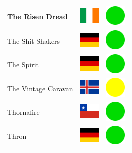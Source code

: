 \documentclass[12pt, a4paper, twoside]{report}
\begin{document}
\begin{center}
\begin{longtable}{|p{5cm}|p{2cm}|p{2cm}|}
 The Risen Dread                                            & \includegraphics[width=1cm]{4x3/ie} &   \includegraphics[width=1cm]{likes/y} \\ \hline
 The Shit Shakers                                           & \includegraphics[width=1cm]{4x3/de} &   \includegraphics[width=1cm]{likes/y} \\ \hline
 The Spirit                                                 & \includegraphics[width=1cm]{4x3/de} &   \includegraphics[width=1cm]{likes/y} \\ \hline
 The Vintage Caravan                                        & \includegraphics[width=1cm]{4x3/is} &   \includegraphics[width=1cm]{likes/m} \\ \hline
 Thornafire                                                 & \includegraphics[width=1cm]{4x3/cl} &   \includegraphics[width=1cm]{likes/y} \\ \hline
 Thron                                                      & \includegraphics[width=1cm]{4x3/de} &   \includegraphics[width=1cm]{likes/y} \\ \hline

\end{longtable}
\end{center}
\end{document}

